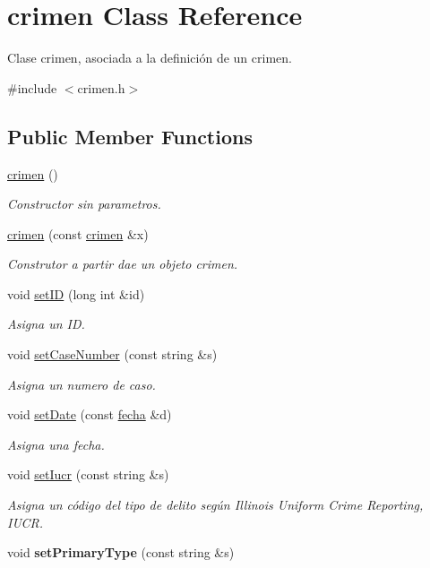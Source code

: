 \hypertarget{classcrimen}{}\section{crimen Class Reference}
\label{classcrimen}


Clase crimen, asociada a la definición de un crimen.  




{\ttfamily \#include $<$crimen.\+h$>$}

\subsection*{Public Member Functions}
\begin{DoxyCompactItemize}
\item 
\hypertarget{classcrimen_ab1147e36869c7e635699e4ef746a7555}{}\hyperlink{classcrimen_ab1147e36869c7e635699e4ef746a7555}{crimen} ()\label{classcrimen_ab1147e36869c7e635699e4ef746a7555}

\begin{DoxyCompactList}\small\item\em Constructor sin parametros. \end{DoxyCompactList}\item 
\hyperlink{classcrimen_a50b783e821c2f5bc829eceb9048c12d7}{crimen} (const \hyperlink{classcrimen}{crimen} \&x)
\begin{DoxyCompactList}\small\item\em Construtor a partir dae un objeto crimen. \end{DoxyCompactList}\item 
void \hyperlink{classcrimen_a2675734f5049f41b5fb5dbc4778df7f8}{set\+I\+D} (long int \&id)
\begin{DoxyCompactList}\small\item\em Asigna un I\+D. \end{DoxyCompactList}\item 
void \hyperlink{classcrimen_a98ee8c42a0ec09c704c5f17e812a6bd5}{set\+Case\+Number} (const string \&s)
\begin{DoxyCompactList}\small\item\em Asigna un numero de caso. \end{DoxyCompactList}\item 
void \hyperlink{classcrimen_ac308c139bb8b599a7badbecd91bfbc5a}{set\+Date} (const \hyperlink{classfecha}{fecha} \&d)
\begin{DoxyCompactList}\small\item\em Asigna una fecha. \end{DoxyCompactList}\item 
void \hyperlink{classcrimen_a9903f49178ad0001f39c03d018b05a2a}{set\+Iucr} (const string \&s)
\begin{DoxyCompactList}\small\item\em Asigna un código del tipo de delito según Illinois Uniform Crime Reporting, I\+U\+C\+R. \end{DoxyCompactList}\item 
\hypertarget{classcrimen_a959223f59be38a0cdb28ea29f294f1d3}{}void {\bfseries set\+Primary\+Type} (const string \&s)\label{classcrimen_a959223f59be38a0cdb28ea29f294f1d3}


\end{DoxyCompactItemize}
